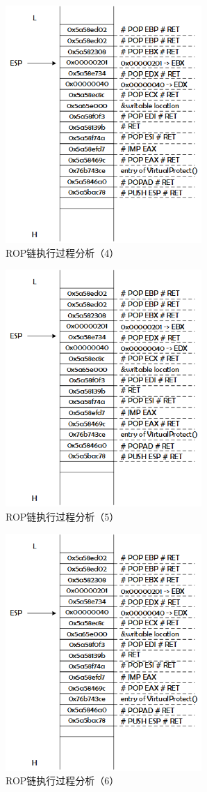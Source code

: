 \documentclass[bachelor]{thesis-uestc}
\begin{document}
\begin{figure}[htbp]
	\centering\includegraphics[height=9cm]{images/rop_chain_s4.png}
	\caption{ROP链执行过程分析（4）}
	\label{fig:rop_chain_s4}
\end{figure}

\begin{figure}[htbp]
	\centering\includegraphics[height=9cm]{images/rop_chain_s5.png}
	\caption{ROP链执行过程分析（5）}
	\label{fig:rop_chain_s5}
\end{figure}

\begin{figure}[htbp]
	\centering\includegraphics[height=9cm]{images/rop_chain_s6.png}
	\caption{ROP链执行过程分析（6）}
	\label{fig:rop_chain_s6}
\end{figure}
\end{document}
